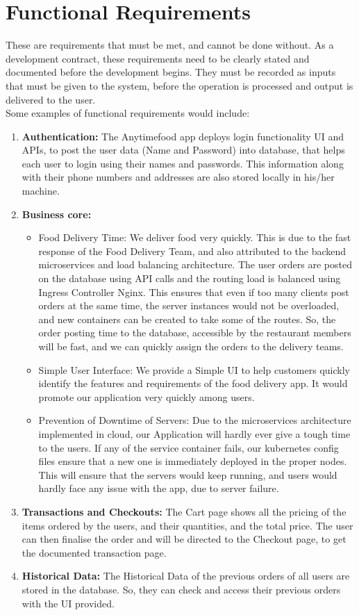 \documentclass{scrreprt}
\begin{document}
\section{Functional Requirements}
 These are requirements that must be met, and cannot be done without. As a development contract, these requirements need to be clearly stated and documented before the development begins. They must be recorded as inputs that must be given to the system, before the operation is processed and output is delivered to the user.\\

Some examples of functional requirements would include: 
\begin{enumerate}
    \item \textbf{Authentication:} The Anytimefood app deploys login functionality UI and APIs, to post the user data (Name and Password) into database, that helps each user to login using their names and passwords. This information along with their phone numbers and addresses are also stored locally in his/her machine.
    \item \textbf{Business core:} 
    \begin{itemize}
        \item Food Delivery Time: We deliver food very quickly. This is due to the fast response of the Food Delivery Team, and also attributed to the backend microservices and load balancing architecture. The user orders are posted on the database using API calls and the routing load is balanced using Ingress Controller Nginx. This ensures that even if too many clients post orders at the same time, the server instances would not be overloaded, and new containers can be created to take some of the routes. So, the order posting time to the database, accessible by the restaurant members will be fast, and we can quickly assign the orders to the delivery teams.
        \item Simple User Interface: We provide a Simple UI to help customers quickly identify the features and requirements of the food delivery app. It would promote our application very quickly among users.
        \item Prevention of Downtime of Servers: Due to the microservices architecture implemented in cloud, our Application will hardly ever give a tough time to the users. If any of the service container fails, our kubernetes config files ensure that a new one is immediately deployed in the proper nodes. This will ensure that the servers would keep running, and users would hardly face any issue with the app, due to server failure.
    \end{itemize}
    \item \textbf{Transactions and Checkouts:}  The Cart page shows all the pricing of the items ordered by the users, and their quantities, and the total price. The user can then finalise the order and will be directed to the Checkout page, to get the documented transaction page.
    \item \textbf{Historical Data: } The Historical Data of the previous orders of all users are stored in the database. So, they can check and access their previous orders with the UI provided.
\end{enumerate}
\end{document}
